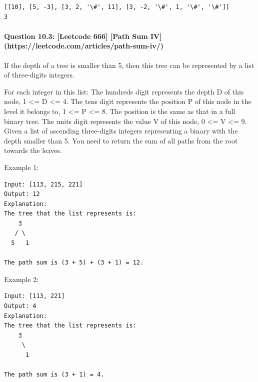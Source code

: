 \documentclass[11pt]{article}
\begin{document}
    \begin{Verbatim}[commandchars=\\\{\}]
[[10], [5, -3], [3, 2, '\#', 11], [3, -2, '\#', 1, '\#', '\#']]
3

    \end{Verbatim}

    \paragraph{Question 10.3: {[}Leetcode 666{]} {[}Path Sum
IV{]}(https://leetcode.com/articles/path-sum-iv/)}\label{question-10.3-leetcode-666-path-sum-ivhttpsleetcode.comarticlespath-sum-iv}

If the depth of a tree is smaller than 5, then this tree can be
represented by a list of three-digits integers.

For each integer in this list: The hundreds digit represents the depth D
of this node, 1 \textless{}= D \textless{}= 4. The tens digit represents
the position P of this node in the level it belongs to, 1 \textless{}= P
\textless{}= 8. The position is the same as that in a full binary tree.
The units digit represents the value V of this node, 0 \textless{}= V
\textless{}= 9. Given a list of ascending three-digits integers
representing a binary with the depth smaller than 5. You need to return
the sum of all paths from the root towards the leaves.

Example 1:

\begin{verbatim}
Input: [113, 215, 221]
Output: 12
Explanation: 
The tree that the list represents is:
    3
   / \
  5   1

The path sum is (3 + 5) + (3 + 1) = 12.
\end{verbatim}

Example 2:

\begin{verbatim}
Input: [113, 221]
Output: 4
Explanation: 
The tree that the list represents is: 
    3
     \
      1

The path sum is (3 + 1) = 4.
\end{verbatim}
\end{document}
